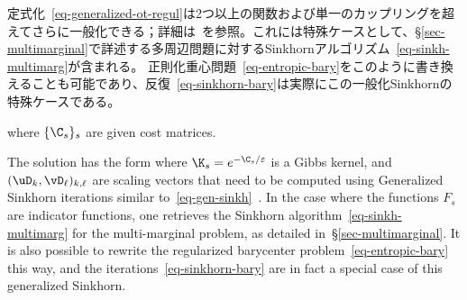 定式化~\eqref{eq-generalized-ot-regul}は2つ以上の関数および単一のカップリングを超えてさらに一般化できる；詳細は~\citep{2016-chizat-sinkhorn}を参照。これには特殊ケースとして、\S\ref{sec-multimarginal}で詳述する多周辺問題に対するSinkhornアルゴリズム~\eqref{eq-sinkh-multimarg}が含まれる。
%
正則化重心問題~\eqref{eq-entropic-bary}をこのように書き換えることも可能であり、反復~\eqref{eq-sinkhorn-bary}は実際にこの一般化Sinkhornの特殊ケースである。


where $\{\C_s\}_s$ are given cost matrices.

The solution has the form
where $\K_s=e^{-\C_s/\varepsilon}$ is a Gibbs kernel, and $(\uD_k,\vD_\ell)_{k,\ell}$ are scaling vectors that need to be computed using Generalized Sinkhorn iterations similar to~\eqref{eq-gen-sinkh}~\citep{2016-chizat-sinkhorn}.
%
In the case where the functions $F_s$ are indicator functions, one retrieves the Sinkhorn algorithm~\eqref{eq-sinkh-multimarg} for the multi-marginal problem, as detailed in~\S\ref{sec-multimarginal}.
%
It is also possible to rewrite the regularized barycenter problem~\eqref{eq-entropic-bary} this way, and the iterations~\eqref{eq-sinkhorn-bary} are in fact a special case of this generalized Sinkhorn.

\fi %


